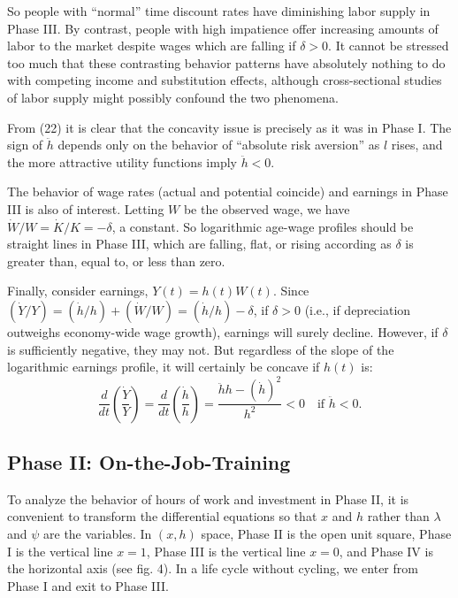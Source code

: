 \documentclass[11pt,fleqn]{article}
\begin{document}
So people with ``normal'' time discount rates have diminishing labor supply in Phase III. By contrast, people with high impatience offer increasing amounts of labor to the market despite wages which are falling if $\delta > 0$. It cannot be stressed too much that these contrasting behavior patterns have absolutely nothing to do with competing income and substitution effects, although cross-sectional studies of labor supply might possibly confound the two phenomena.

From (22) it is clear that the concavity issue is precisely as it was in Phase I. The sign of $\ddot{h}$ depends only on the behavior of ``absolute risk aversion'' as $l$ rises, and the more attractive utility functions imply $\ddot{h} < 0$.

The behavior of wage rates (actual and potential coincide) and earnings in Phase III is also of interest. Letting $W$ be the observed wage, we have $\dot{W}/W = \dot{K}/K = -\delta$, a constant. So logarithmic age-wage profiles should be straight lines in Phase III, which are falling, flat, or rising according as $\delta$ is greater than, equal to, or less than zero.

Finally, consider earnings, $Y(t) = h(t)W(t)$. Since $(\dot{Y}/Y) = (\dot{h}/h) + (\dot{W}/W) = (\dot{h}/h) - \delta$, if $\delta > 0$ (i.e., if depreciation outweighs economy-wide wage growth), earnings will surely decline. However, if $\delta$ is sufficiently negative, they may not. But regardless of the slope of the logarithmic earnings profile, it will certainly be concave if $h(t)$ is:
\[
\frac{d}{dt} \left(\frac{\dot{Y}}{Y}\right) = \frac{d}{dt} \left(\frac{\dot{h}}{h}\right) = \frac{\ddot{h}h - (\dot{h})^2}{h^2} < 0 \quad \text{if } \ddot{h} < 0.
\]

\subsection{Phase II: On-the-Job-Training}

To analyze the behavior of hours of work and investment in Phase II, it is convenient to transform the differential equations so that $x$ and $h$ rather than $\lambda$ and $\psi$ are the variables. In $(x, h)$ space, Phase II is the open unit square, Phase I is the vertical line $x = 1$, Phase III is the vertical line $x = 0$, and Phase IV is the horizontal axis (see fig. 4). In a life cycle without cycling, we enter from Phase I and exit to Phase III.
\end{document}
